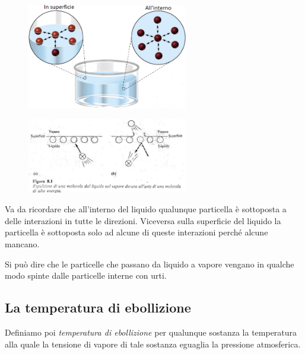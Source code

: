 \hspace{0.5cm}\begin{minipage}{0.5 \textwidth}
    \begin{figure}[H]
        \includegraphics[width=7cm]{immagini/interazioni_nel_liquido.png}
    \end{figure}
\end{minipage}
\begin{minipage}{0.5 \textwidth}
    \begin{figure}[H]
        \includegraphics[width=7cm]{immagini/espulsione_particelle.png}
    \end{figure}
\end{minipage}

\vspace{0.2cm}Va da ricordare che all'interno del liquido qualunque particella è sottoposta a delle interazioni in tutte le direzioni. Viceversa sulla superficie del liquido la particella è sottoposta solo ad alcune di queste interazioni perché alcune mancano.

Si può dire che le particelle che passano da liquido a vapore vengano in qualche modo spinte dalle particelle interne con urti.

\subsection{La temperatura di ebollizione}
\vspace{0.2cm}Definiamo poi \textit{temperatura di ebollizione} per qualunque sostanza la temperatura alla quale la tensione di vapore di tale sostanza eguaglia la pressione atmosferica.

